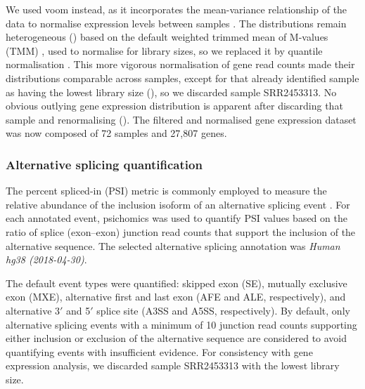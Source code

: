We used voom instead, as it incorporates the mean-variance relationship of the data to normalise expression levels between samples \cite{ritchie:2015tm}. The distributions remain heterogeneous () based on the default weighted trimmed mean of M-values (TMM) \cite{robinson:2010wx}, used to normalise for library sizes, so we replaced it by quantile normalisation \cite{ritchie:2015tm}. This more vigorous normalisation of gene read counts made their distributions comparable across samples, except for that already identified sample as having the lowest library size (), so we discarded sample SRR2453313. No obvious outlying gene expression distribution is apparent after discarding that sample and renormalising (). The filtered and normalised gene expression dataset was now composed of 72 samples and 27,807 genes.

\subsubsection{Alternative splicing quantification}

The percent spliced-in (PSI) metric is commonly employed to measure the relative abundance of the inclusion isoform of an alternative splicing event \cite{wang:2008wa}. For each annotated event, psichomics was used to quantify PSI values based on the ratio of splice (exon–exon) junction read counts that support the inclusion of the alternative sequence. The selected alternative splicing annotation was \emph{Human hg38 (2018-04-30)}.

The default event types were quantified: skipped exon (SE), mutually exclusive exon (MXE), alternative first and last exon (AFE and ALE, respectively), and alternative 3$'$ and 5$'$ splice site (A3SS and A5SS, respectively). By default, only alternative splicing events with a minimum of 10 junction read counts supporting either inclusion or exclusion of the alternative sequence are considered to avoid quantifying events with insufficient evidence. For consistency with gene expression analysis, we discarded sample SRR2453313 with the lowest library size.

